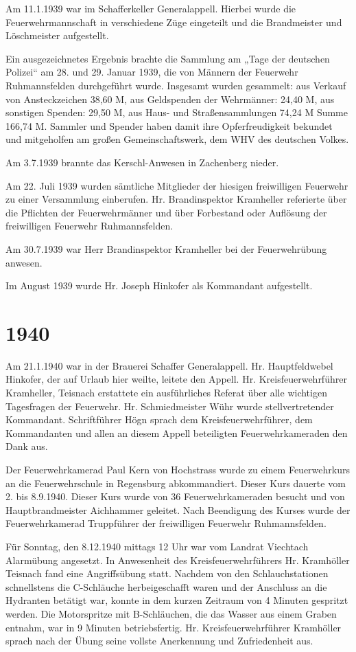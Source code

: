 \documentclass[12pt,a4paper]{book}
\begin{document}
Am 11.1.1939 war im Schafferkeller Generalappell. Hierbei wurde die
Feuerwehrmannschaft in verschiedene Züge eingeteilt und die Brandmeister und
Löschmeister aufgestellt.

Ein ausgezeichnetes Ergebnis brachte die Sammlung am „Tage der deutschen
Polizei“ am 28. und 29. Januar 1939, die von Männern der Feuerwehr
Ruhmannsfelden durchgeführt wurde. Insgesamt wurden gesammelt: aus Verkauf von
Ansteckzeichen 38,60 M, aus Geldspenden der Wehrmänner: 24,40 M, aus sonstigen
Spenden: 29,50 M, aus Haus- und Straßensammlungen 74,24 M Summe 166,74 M.
Sammler und Spender haben damit ihre Opferfreudigkeit bekundet und mitgeholfen
am großen Gemeinschaftswerk, dem WHV des deutschen Volkes.

Am 3.7.1939 brannte das Kerschl-Anwesen in Zachenberg nieder.

Am 22. Juli 1939 wurden sämtliche Mitglieder der hiesigen freiwilligen Feuerwehr
zu einer Versammlung einberufen. Hr. Brandinspektor Kramheller referierte über
die Pflichten der Feuerwehrmänner und über Forbestand oder Auflösung der
freiwilligen Feuerwehr Ruhmannsfelden.

Am 30.7.1939 war Herr Brandinspektor Kramheller bei der Feuerwehrübung anwesen.

Im August 1939 wurde Hr. Joseph Hinkofer als Kommandant aufgestellt.

\section*{1940}

Am 21.1.1940 war in der Brauerei Schaffer Generalappell. Hr. Hauptfeldwebel
Hinkofer, der auf Urlaub hier weilte, leitete den Appell. Hr.
Kreisfeuerwehrführer Kramheller, Teisnach erstattete ein ausführliches Referat
über alle wichtigen Tagesfragen der Feuerwehr. Hr. Schmiedmeister Wühr wurde
stellvertretender Kommandant. Schriftführer Högn sprach dem
Kreisfeuerwehrführer, dem Kommandanten und allen an diesem Appell beteiligten
Feuerwehrkameraden den Dank aus.

Der Feuerwehrkamerad Paul Kern von Hochstrass wurde zu einem Feuerwehrkurs an
die Feuerwehrschule in Regensburg abkommandiert. Dieser Kurs dauerte vom 2. bis
8.9.1940. Dieser Kurs wurde von 36 Feuerwehrkameraden besucht und von
Hauptbrandmeister Aichhammer geleitet. Nach Beendigung des Kurses wurde der
Feuerwehrkamerad Truppführer der freiwilligen Feuerwehr Ruhmannsfelden.

Für Sonntag, den 8.12.1940 mittags 12 Uhr war vom Landrat Viechtach Alarmübung
angesetzt. In Anwesenheit des Kreisfeuerwehrführers Hr. Kramhöller Teisnach fand
eine Angriffsübung statt. Nachdem von den Schlauchstationen schnellstens die
C-Schläuche herbeigeschafft waren und der Anschluss an die Hydranten betätigt
war, konnte in dem kurzen Zeitraum von 4 Minuten gespritzt werden. Die
Motorspritze mit B-Schläuchen, die das Wasser aus einem Graben entnahm, war in 9
Minuten betriebsfertig. Hr. Kreisfeuerwehrführer Kramhöller sprach nach der
Übung seine vollste Anerkennung und Zufriedenheit aus.
\end{document}
